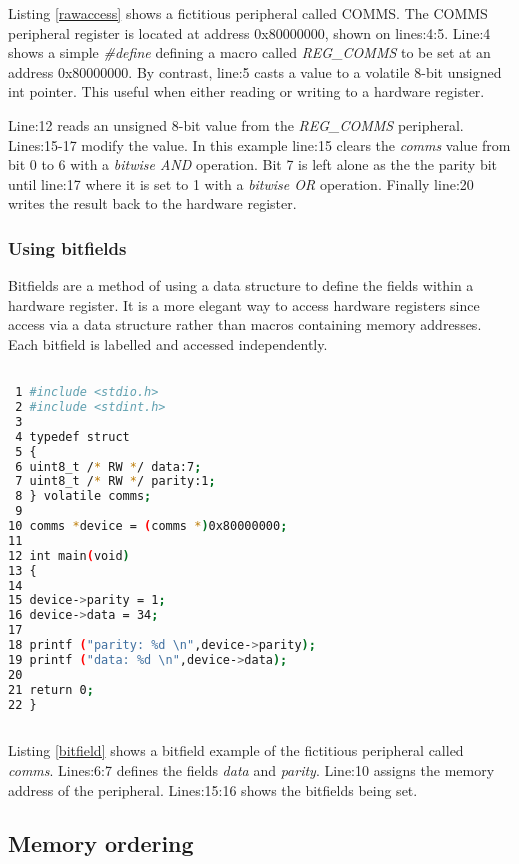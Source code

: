 Listing \ref{rawaccess} shows a fictitious peripheral called COMMS. The COMMS peripheral register  is located at address 0x80000000, shown on lines:4:5. Line:4 shows a simple \textit{\#define} defining a macro called \textit{REG\_COMMS} to be set at an address 0x80000000. By contrast, line:5 casts a value to a volatile 8-bit unsigned int pointer. This useful when either reading or writing to a hardware register.

Line:12 reads an unsigned 8-bit value from the \textit{REG\_COMMS} peripheral. Lines:15-17 modify the value. In this example line:15 clears the \textit{comms} value from bit 0 to 6 with a \textit{bitwise AND} operation. Bit 7 is left alone as the the parity bit until line:17 where it is set to 1 with a \textit{bitwise OR} operation. Finally line:20 writes the result back to the hardware register.

\subsubsection{Using bitfields} 

Bitfields are a method of using a data structure to define the fields within a hardware register. It is a more elegant way to access hardware registers since access via a data structure rather than macros containing memory addresses. Each bitfield is labelled and accessed independently.  

\begin{lstlisting}[language=bash,showstringspaces=false,caption={File: bitfield.c},captionpos=b,label=bitfield]

 1 #include <stdio.h>
 2 #include <stdint.h>
 3 
 4 typedef struct
 5 {
 6 uint8_t /* RW */ data:7;
 7 uint8_t /* RW */ parity:1;
 8 } volatile comms;
 9 
10 comms *device = (comms *)0x80000000;
11 
12 int main(void)
13 {
14 
15 device->parity = 1;
16 device->data = 34;
17 
18 printf ("parity: %d \n",device->parity);
19 printf ("data: %d \n",device->data);
20 
21 return 0;
22 }
	
\end{lstlisting}

Listing \ref{bitfield} shows a bitfield example of the fictitious peripheral called \textit{comms}. Lines:6:7 defines the fields \textit{data} and \textit{parity}. Line:10 assigns the memory address of the peripheral. Lines:15:16 shows the bitfields being set.

\subsection{Memory ordering}   

